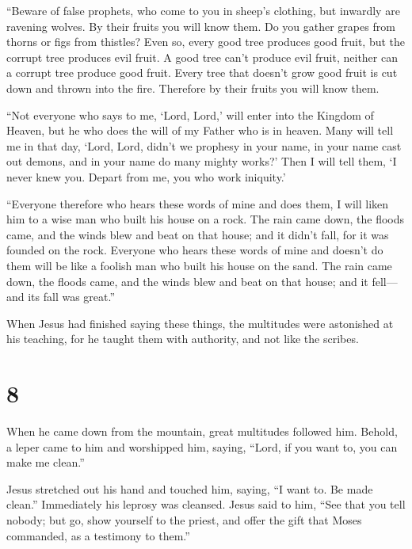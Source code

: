  ``Beware of false prophets, who come to you in sheep's
clothing, but inwardly are ravening wolves.  By their
fruits you will know them. Do you gather grapes from thorns or figs from
thistles?  Even so, every good tree produces good fruit,
but the corrupt tree produces evil fruit.  A good tree
can't produce evil fruit, neither can a corrupt tree produce good fruit.
 Every tree that doesn't grow good fruit is cut down and
thrown into the fire.  Therefore by their fruits you will
know them.

 ``Not everyone who says to me, `Lord, Lord,' will enter
into the Kingdom of Heaven, but he who does the will of my Father who is
in heaven.  Many will tell me in that day, `Lord, Lord,
didn't we prophesy in your name, in your name cast out demons, and in
your name do many mighty works?'  Then I will tell them,
`I never knew you. Depart from me, you who work iniquity.'

 ``Everyone therefore who hears these words of mine and
does them, I will liken him to a wise man who built his house on a rock.
 The rain came down, the floods came, and the winds blew
and beat on that house; and it didn't fall, for it was founded on the
rock.  Everyone who hears these words of mine and doesn't
do them will be like a foolish man who built his house on the sand.
 The rain came down, the floods came, and the winds blew
and beat on that house; and it fell---and its fall was great.''

 When Jesus had finished saying these things, the
multitudes were astonished at his teaching,  for he
taught them with authority, and not like the scribes.

\hypertarget{section-7}{%
\section{8}\label{section-7}}

 When he came down from the mountain, great multitudes
followed him.  Behold, a leper came to him and worshipped
him, saying, ``Lord, if you want to, you can make me clean.''

 Jesus stretched out his hand and touched him, saying, ``I
want to. Be made clean.'' Immediately his leprosy was cleansed.
 Jesus said to him, ``See that you tell nobody; but go,
show yourself to the priest, and offer the gift that Moses commanded, as
a testimony to them.''

